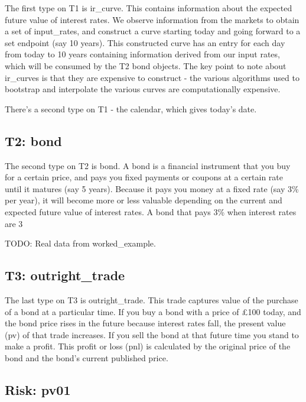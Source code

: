 \documentclass{report}
\begin{document}
The first type on T1 is ir_curve. This contains information about the expected future value of interest rates. We observe information from the markets to obtain a set of input_rates, and construct a curve starting today and going forward to a set endpoint (say 10 years). This constructed curve has an entry for each day from today to 10 years containing information derived from our input rates, which will be consumed by the T2 bond objects. The key point to note about ir_curves is that they are expensive to construct - the various algorithms used to bootstrap and interpolate the various curves are computationally expensive.

There's a second type on T1 - the calendar, which gives today's date.

\subsection{T2: bond}

The second type on T2 is bond. A bond is a financial instrument that you buy for a certain price, and pays you fixed payments or coupons at a certain rate until it matures (say 5 years). Because it pays you money at a fixed rate (say 3\% per year), it will become more or less valuable depending on the current and expected future value of interest rates. A bond that pays 3\% when interest rates are 3%

TODO: Real data from worked_example.

\subsection{T3: outright_trade}

The last type on T3 is outright_trade. This trade captures value of the purchase of a bond at a particular time. If you buy a bond with a price of £100 today, and the bond price rises in the future because interest rates fall, the present value (pv) of that trade increases. If you sell the bond at that future time you stand to make a profit. This profit or loss (pnl) is calculated by the original price of the bond and the bond's current published price.

\subsection{Risk: pv01}
\end{document}
